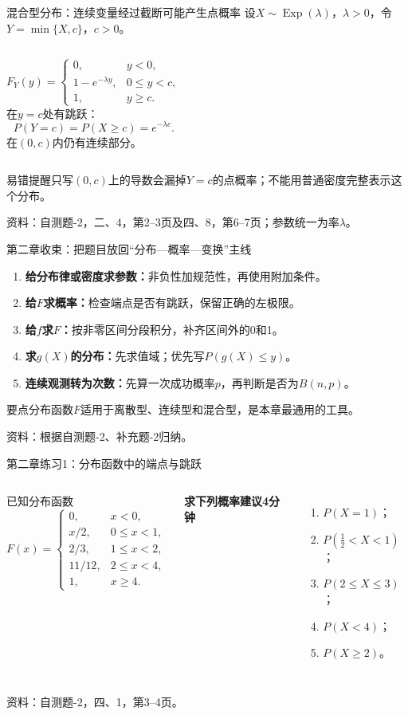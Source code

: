 \documentclass[aspectratio=169,10pt]{beamer}
\DeclareMathOperator{\Exp}{Exp}
\newcommand{\source}[1]{\vfill{\color{Muted}\fontsize{6.5}{8}\selectfont 资料：#1\par}}
\newcommand{\key}[1]{\begin{block}{要点}#1\end{block}}
\newcommand{\warn}[1]{\begin{alertblock}{易错提醒}#1\end{alertblock}}
\begin{document}
\begin{frame}[t]{混合型分布：连续变量经过截断可能产生点概率}
设$X\sim\Exp(\lambda)$，$\lambda>0$，令$Y=\min\{X,c\}$，$c>0$。
\begin{columns}[T]
\[
F_Y(y)=\begin{cases}0,&y<0,\\1-e^{-\lambda y},&0\le y<c,\\1,&y\ge c.\end{cases}
\]
在$y=c$处有跳跃：
\[
P(Y=c)=P(X\ge c)=e^{-\lambda c}.
\]
在$(0,c)$内仍有连续部分。
\end{columns}
\warn{只写$(0,c)$上的导数会漏掉$Y=c$的点概率；不能用普通密度完整表示这个分布。}
\source{自测题-2，二、4，第2--3页及四、8，第6--7页；参数统一为率$\lambda$。}
\end{frame}

\begin{frame}[t]{第二章收束：把题目放回“分布—概率—变换”主线}
\begin{enumerate}
\item \textbf{给分布律或密度求参数：}非负性加规范性，再使用附加条件。
\item \textbf{给$F$求概率：}检查端点是否有跳跃，保留正确的左极限。
\item \textbf{给$f$求$F$：}按非零区间分段积分，补齐区间外的0和1。
\item \textbf{求$g(X)$的分布：}先求值域；优先写$P(g(X)\le y)$。
\item \textbf{连续观测转为次数：}先算一次成功概率$p$，再判断是否为$B(n,p)$。
\end{enumerate}
\key{分布函数$F$适用于离散型、连续型和混合型，是本章最通用的工具。}
\source{根据自测题-2、补充题-2归纳。}
\end{frame}

\begin{frame}[t]{第二章练习1：分布函数中的端点与跳跃}
\begin{columns}[T]
\begin{block}{已知分布函数}
\[
F(x)=\begin{cases}0,&x<0,\\x/2,&0\le x<1,\\2/3,&1\le x<2,\\11/12,&2\le x<4,\\1,&x\ge4.\end{cases}
\]
\end{block}
\textbf{求下列概率\quad 建议4分钟}
\begin{enumerate}
\item $P(X=1)$；
\item $P(\tfrac12<X<1)$；
\item $P(2\le X\le3)$；
\item $P(X<4)$；
\item $P(X\ge2)$。
\end{enumerate}
\end{columns}
\source{自测题-2，四、1，第3--4页。}
\end{frame}
\end{document}
